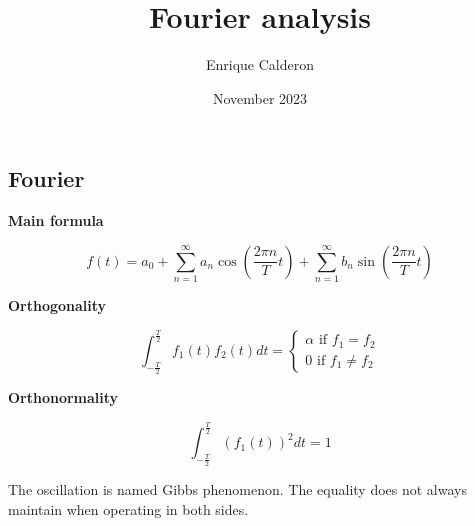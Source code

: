 \documentclass[letterpaper]{article}
\title{Fourier analysis}
\author{Enrique Calderon}
\date{November 2023}
\newcommand{\divline}{\noindent\makebox[\linewidth]{\rule{\textwidth}{0.4pt}}}
\begin{document}
	\maketitle
	
	\divline
	
	\begin{multicols}{2}
		\section{Fourier}
		
		\textbf{Main formula}
		
		\[f(t) = a_{0} + \sum_{n = 1}^{\infty} a_{n} \cos{( \frac{2 \pi n}{T} t )} + \sum_{n = 1}^{\infty} b_{n} \sin{( \frac{2 \pi n}{T} t )} \]
		
		\textbf{Orthogonality}
		
		\[ \int_{-\frac{T}{2}}^{\frac{T}{2}} f_{1}(t) f_{2}(t) dt = 
		\begin{cases} 
			\alpha \text{ if } f_{1} = f_{2} \\
			0 \text{ if } f_{1} \neq f_{2}
		\end{cases}
		\]
		
		\textbf{Orthonormality}
		
		\[ \int_{-\frac{T}{2}}^{\frac{T}{2}} (f_{1}(t))^2 dt = 1 \]
		
		The oscillation is named Gibbs phenomenon.
		The equality does not always maintain when operating in both sides.
		
	\end{multicols}
	
	\divline
	
\end{document}
